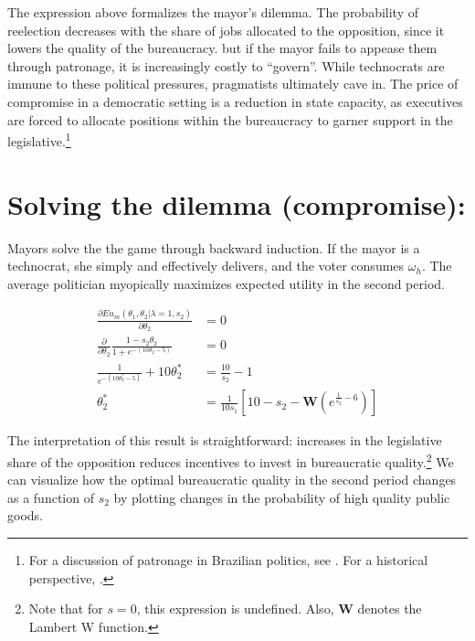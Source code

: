 \documentclass[12pt,]{book}
\let\rmarkdownfootnote\footnote%
\def\footnote{\protect\rmarkdownfootnote}
\begin{document}
The expression above formalizes the mayor's dilemma. The probability of reelection decreases with the share of jobs allocated to the opposition, since it lowers the quality of the bureaucracy. but if the mayor fails to appease them through patronage, it is increasingly costly to ``govern''. While technocrats are immune to these political pressures, pragmatists ultimately cave in. The price of compromise in a democratic setting is a reduction in state capacity, as executives are forced to allocate positions within the bureaucracy to garner support in the legislative.\footnote{For a discussion of patronage in Brazilian politics, see \citet{nunes_gramatica_1997}. For a historical perspective, \citet{graham_patronage_1994}.}

\hypertarget{solving-the-dilemma-compromise}{%
\section{Solving the dilemma (compromise):}\label{solving-the-dilemma-compromise}}

Mayors solve the the game through backward induction. If the mayor is a technocrat, she simply and effectively delivers, and the voter consumes \(\omega_h\). The average politician myopically maximizes expected utility in the second period.

\begin{align*}
\frac{\partial Eu_{m}(\theta_1, \theta_2|\lambda = 1, s_2)}{\partial \theta_2} &= 0 \\
\frac{\partial}{\partial \theta_2} \frac{1-s_2\theta_2}{1+e^{-(10\theta_2-5)}} &= 0 \\
\frac{1}{e^{-(10\theta_2^*-5)}}+10\theta_2^* &= \frac{10}{s_2} - 1\\
\theta_2^* &= \frac{1}{10s_1}\left[10-s_2-\boldsymbol{W}\left(e^{\frac{1}{s_2}-6}\right)\right]
\end{align*}

The interpretation of this result is straightforward: increases in the legislative share of the opposition reduces incentives to invest in bureaucratic quality.\footnote{Note that for \(s=0\), this expression is undefined. Also, \(\boldsymbol{W}\) denotes the Lambert W function.} We can visualize how the optimal bureaucratic quality in the second period changes as a function of \(s_2\) by plotting changes in the probability of high quality public goods.
\end{document}
